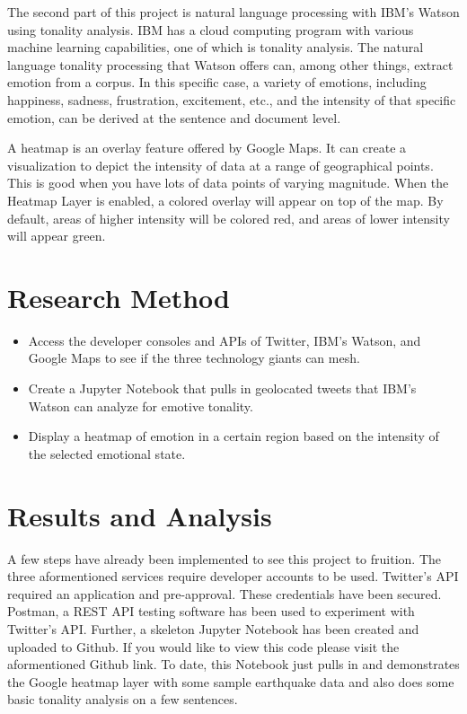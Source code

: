 \documentclass[12pt, oneside]{article}
\begin{document}
The second part of this project is natural language processing with IBM's
Watson using tonality analysis.
IBM has a cloud computing program with various machine learning
capabilities\cite{IBM}, one of which is tonality analysis. The natural language
tonality processing that Watson offers can, among other things, extract emotion
from a corpus. In this specific case, a variety of emotions, including happiness, sadness, frustration, excitement, etc., and the intensity of that specific emotion, can be
derived at the sentence and document level.

A heatmap is an overlay feature offered by Google Maps. It can create a
visualization to depict the intensity of data at a range of geographical points.
This is good when you have lots of data points of varying magnitude. When the
Heatmap Layer is enabled, a colored overlay will appear on top of the map. By
default, areas of higher intensity will be colored red, and areas of lower
intensity will appear green\cite{Google}.

\section{Research Method}
\begin{itemize}
 \item Access the developer consoles and APIs of Twitter, IBM's Watson, and Google Maps to see if the three technology giants can mesh.

 \item Create a Jupyter Notebook that pulls in geolocated tweets that IBM's
 Watson can analyze for emotive tonality.

 \item Display a heatmap of emotion in a certain region based on the intensity
 of the selected emotional state.

\end{itemize}

\section{Results and Analysis}
A few steps have already been implemented to see this project to fruition. The
three aformentioned services require developer accounts to be used.
Twitter's API required an application and pre-approval. These credentials have
been secured. Postman, a REST API testing software has been used to experiment
with Twitter's API\cite{Postman}. Further, a skeleton Jupyter Notebook has
been created and uploaded to Github\cite{Git}. If you would like to view this code please visit the aformentioned Github link. To date, this Notebook just
pulls in and demonstrates the Google heatmap layer with some sample earthquake
data and also does some basic tonality analysis on a few sentences.
\end{document}
